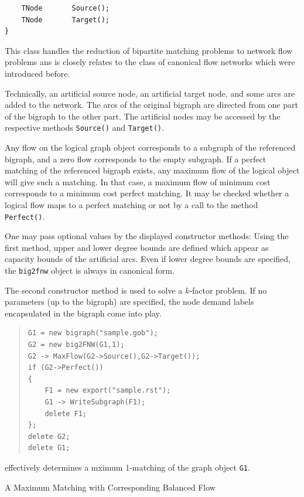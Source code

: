 \documentclass[a4paper,11pt,twoside]{book}
\begin{document}
\begin{multicols}{2}
\begin{mymethods}
\begin{verbatim}
    TNode       Source();
    TNode       Target();
}
\end{verbatim}
\end{mymethods}
This class handles the reduction of bipartite matching problems to network flow
problems ans is closely relates to the class of canonical flow networks which
were introduced before.

Technically, an artificial source node, an artificial target node, and
some arcs are added to the network. The arcs of the original bigraph
are directed from one part of the bigraph to the other part. The artificial
nodes may be accessed by the respective methods \verb/Source()/ and
\verb/Target()/.

Any flow on the logical graph object corresponds to a subgraph of the
referenced bigraph, and a zero flow corresponds to the empty subgraph.
If a perfect matching of the referenced bigraph exists, any maximum flow of
the logical object will give such a matching. In that case, a maximum flow of
minimum cost corresponds to a minimum cost perfect matching. It may be checked
whether a logical flow maps to a perfect matching or not by a call to the
method \verb/Perfect()/.

One may pass optional values by the displayed constructor methods: Using the
first method, upper and lower degree bounds are defined which appear
as capacity bounds of the artificial arcs. Even if lower degree bounds are
specified, the \verb/big2fnw/ object is always in canonical form.

The second constructor method is used to solve a $k$-factor problem. If no
parameters (up to the bigraph) are specified, the node demand labels
encapsulated in the bigraph come into play.
\sample
\begin{quote}
\begin{verbatim}
G1 = new bigraph("sample.gob");
G2 = new big2FNW(G1,1);
G2 -> MaxFlow(G2->Source(),G2->Target());
if (G2->Perfect())
{
    F1 = new export("sample.rst");
    G1 -> WriteSubgraph(F1);
    delete F1;
};
delete G2;
delete G1;
\end{verbatim}
\end{quote}
effectively determines a mximum 1-matching of the graph object \verb/G1/.

\bigskip
\begin{figurehere}
\begin{center}
\epsfxsize=4cm
\epsfxsize=6cm
\hspace*{1cm}
\vspace{0.5cm}
\caption{\label{flb_general}A Maximum Matching with Corresponding Balanced Flow}
\end{center}
\end{figurehere}



\end{multicols}
\end{document}
